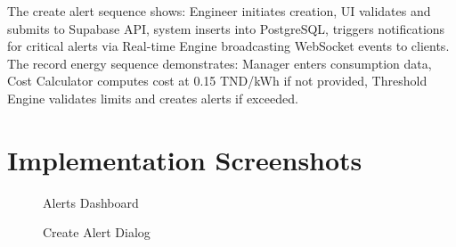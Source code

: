 The create alert sequence shows: Engineer initiates creation, UI validates and submits to Supabase API, system inserts into PostgreSQL, triggers notifications for critical alerts via Real-time Engine broadcasting WebSocket events to clients. The record energy sequence demonstrates: Manager enters consumption data, Cost Calculator computes cost at 0.15 TND/kWh if not provided, Threshold Engine validates limits and creates alerts if exceeded.

\section{Implementation Screenshots}

\begin{figure}[H]
\centering
\begin{minipage}{0.48\textwidth}
\centering
{}
\caption{Alerts Dashboard}
\end{minipage}
\hfill
\begin{minipage}{0.48\textwidth}
\centering
{}
\caption{Create Alert Dialog}
\end{minipage}
\end{figure}

